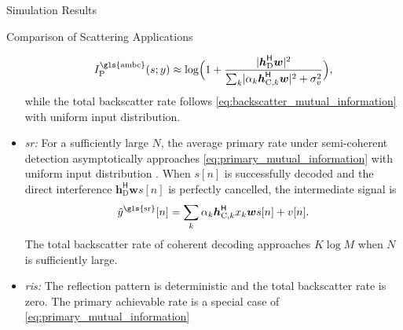 \documentclass[journal]{IEEEtran}
\begin{document}
\begin{section}{Simulation Results}
\begin{subsection}{Comparison of Scattering Applications}
\begin{itemize}
			\begin{equation}
				I_{\text{P}}^{\text{\gls{ambc}}}(s;y) \approx \log \Bigl(1 + \frac{\lvert\boldsymbol{h}_{\text{D}}^\mathsf{H}\boldsymbol{w}\rvert^2}{\sum_{k}\lvert \alpha_k \boldsymbol{h}_{\text{C},k}^\mathsf{H} \boldsymbol{w}\rvert^2+\sigma_v^2}\Bigr),
			\end{equation}
			while the total backscatter rate follows \eqref{eq:backscatter_mutual_information} with uniform input distribution.
			\item \emph{\gls{sr}:} For a sufficiently large $N$, the average primary rate under semi-coherent detection asymptotically approaches \eqref{eq:primary_mutual_information} with uniform input distribution \cite{Long2020a}.
			When $s[n]$ is successfully decoded and the direct interference $\boldsymbol{h}_{\text{D}}^\mathsf{H} \boldsymbol{w} s[n]$ is perfectly cancelled, the intermediate signal is
			\begin{equation}
				\hat{y}^{\text{\gls{sr}}}[n] = \sum_{k} \alpha_k \boldsymbol{h}_{\text{C},k}^\mathsf{H} x_k \boldsymbol{w} s[n] + v[n].
				\label{eq:intermediate_signal}
			\end{equation}
			The total backscatter rate of coherent decoding approaches $K \log M$ when $N$ is sufficiently large.
			\item \emph{\gls{ris}:} The reflection pattern is deterministic and the total backscatter rate is zero.
			The primary achievable rate is a special case of \eqref{eq:primary_mutual_information}
			\begin{equation}

\end{equation}
\end{itemize}
\end{subsection}
\end{section}
\end{document}
